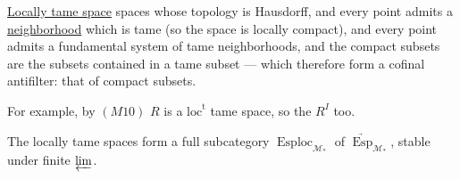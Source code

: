 \uline{Locally tame space}   spaces whose topology is  Hausdorff, and every point admits a \uline{neighborhood} which is  tame (so the space is locally compact), and every point admits a fundamental system of tame neighborhoods, and the compact subsets are the subsets contained in a tame subset --- which therefore form a cofinal antifilter: that of compact subsets.

For example, by $(M10)$ $R$ is a $\mathrm{loc}^{\mathrm t}$ tame space, so the $R^I$ too.

The locally tame spaces  form a full subcategory $\operatorname{Esploc}_{\mathcal M_*}$ of $\underrightarrow{\operatorname{Esp}}_{\mathcal M_*}$, stable under finite $\varprojlim$.

